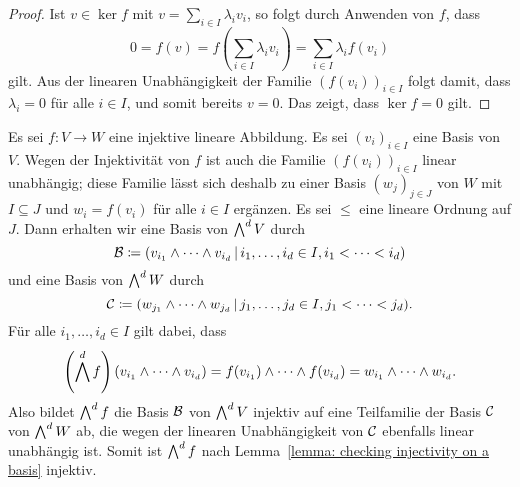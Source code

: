 \begin{proof}
  Ist $v \in \ker f$ mit $v = \sum_{i \in I} \lambda_i v_i$, so folgt durch Anwenden von $f$, dass
  \[
      0
    = f(v)
    = f\left( \sum_{i \in I} \lambda_i v_i \right)
    = \sum_{i \in I} \lambda_i f(v_i)
  \]
  gilt.
  Aus der linearen Unabhängigkeit der Familie $(f(v_i))_{i \in I}$ folgt damit, dass $\lambda_i = 0$ für alle $i \in I$, und somit bereits $v = 0$.
  Das zeigt, dass $\ker f = 0$ gilt.
\end{proof}


Es sei $f \colon V \to W$ eine injektive lineare Abbildung.
Es sei $(v_i)_{i \in I}$ eine Basis von $V$.
Wegen der Injektivität von $f$ ist auch die Familie $(f(v_i))_{i \in I}$ linear unabhängig;
diese Familie lässt sich deshalb zu einer Basis $(w_j)_{j \in J}$ von $W$ mit $I \subseteq J$ und $w_i = f(v_i)$ für alle $i \in I$ ergänzen.
Es sei $\leq$ eine lineare Ordnung auf $J$.
Dann erhalten wir eine Basis von $\bigwedge^{d} V$ durch
\[
            \mathcal{B}
  \coloneqq (
              v_{i_1} \wedge \dotsb \wedge v_{i_d}
            \,|\, 
              i_1, \dotsc, i_d \in I,
              i_1 < \dotsb < i_d
            )
\]
und eine Basis von $\bigwedge^{d} W$ durch
\[
            \mathcal{C}
  \coloneqq (
              w_{j_1} \wedge \dotsb \wedge w_{j_d}
            \,|\, 
              j_1, \dotsc, j_d \in I,
              j_1 < \dotsb < j_d
            ).
\]
Für alle $i_1, \dotsc, i_d \in I$ gilt dabei, dass
\[
    \left( \bigwedge^{d} f \right)(v_{i_1} \wedge \dotsb \wedge v_{i_d})
  = f(v_{i_1}) \wedge \dotsb \wedge f(v_{i_d})
  = w_{i_1} \wedge \dotsb \wedge w_{i_d}.
\]
Also bildet $\bigwedge^{d} f$ die Basis $\mathcal{B}$ von $\bigwedge^{d} V$ injektiv auf eine Teilfamilie der Basis $\mathcal{C}$ von $\bigwedge^{d} W$ ab, die wegen der linearen Unabhängigkeit von $\mathcal{C}$ ebenfalls linear unabhängig ist. Somit ist $\bigwedge^{d} f$ nach Lemma~\ref{lemma: checking injectivity on a basis} injektiv.


